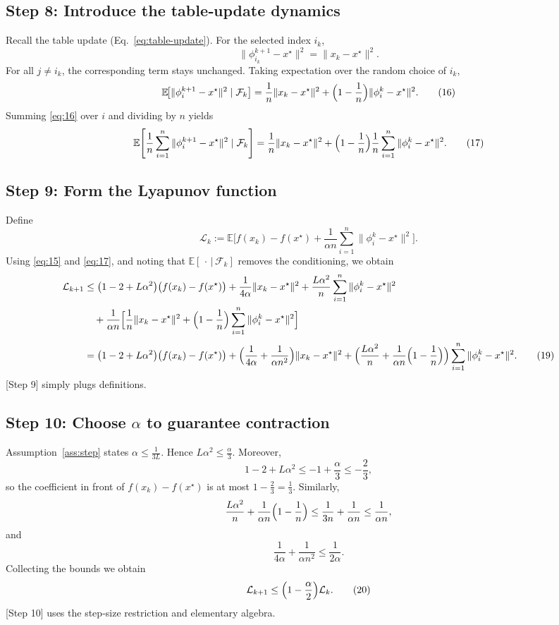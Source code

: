 \documentclass{article}
\begin{document}
\subsection*{Step 8: Introduce the table‑update dynamics}
Recall the table update (Eq.~\eqref{eq:table-update}). For the selected index $i_k$,
\[
\|\phi_{i_k}^{k+1}-x^\star\|^{2}
= \|x_k-x^\star\|^{2}.
\]
For all $j\neq i_k$, the corresponding term stays unchanged. Taking expectation over the random choice of $i_k$,
\[
\mathbb{E}\!\bigl[\|\phi_{i}^{k+1}-x^\star\|^{2}\mid\mathcal{F}_k\bigr]
= \frac{1}{n}\|x_k-x^\star\|^{2}
  +\Bigl(1-\frac{1}{n}\Bigr)\|\phi_i^{k}-x^\star\|^{2}.
\tag{16}
\]
Summing \eqref{eq:16} over $i$ and dividing by $n$ yields
\[
\mathbb{E}\!\left[\frac{1}{n}\sum_{i=1}^{n}\|\phi_i^{k+1}-x^\star\|^{2}\mid\mathcal{F}_k\right]
= \frac{1}{n}\|x_k-x^\star\|^{2}
  +\Bigl(1-\frac{1}{n}\Bigr)\frac{1}{n}\sum_{i=1}^{n}\|\phi_i^{k}-x^\star\|^{2}.
\tag{17}
\]

\subsection*{Step 9: Form the Lyapunov function}
Define
\[
\mathcal{L}_k:=\mathbb{E}\!\bigl[f(x_k)-f(x^\star)
   +\frac{1}{\alpha n}\sum_{i=1}^{n}\|\phi_i^{k}-x^\star\|^{2}\bigr].
\tag{18}
\]
Using \eqref{eq:15} and \eqref{eq:17}, and noting that $\mathbb{E}[\,\cdot\,|\,\mathcal{F}_k]$ removes the conditioning, we obtain
\begin{align}
\mathcal{L}_{k+1}
&\le \bigl(1-2+L\alpha^{2}\bigr)\bigl(f(x_k)-f(x^\star)\bigr)
    +\frac{1}{4\alpha}\|x_k-x^\star\|^{2}
    +\frac{L\alpha^{2}}{n}\sum_{i=1}^{n}\|\phi_i^{k}-x^\star\|^{2}\nonumber\\
&\quad +\frac{1}{\alpha n}\Bigl[\frac{1}{n}\|x_k-x^\star\|^{2}
      +\Bigl(1-\frac{1}{n}\Bigr)\sum_{i=1}^{n}\|\phi_i^{k}-x^\star\|^{2}\Bigr]\nonumber\\[0.3em]
&= \bigl(1-2+L\alpha^{2}\bigr)\bigl(f(x_k)-f(x^\star)\bigr)
   +\Bigl(\frac{1}{4\alpha}+\frac{1}{\alpha n^{2}}\Bigr)\|x_k-x^\star\|^{2}
   +\Bigl(\frac{L\alpha^{2}}{n}+\frac{1}{\alpha n}\Bigl(1-\frac{1}{n}\Bigr)\Bigr)
        \sum_{i=1}^{n}\|\phi_i^{k}-x^\star\|^{2}.
\tag{19}
\end{align}
[Step 9] simply plugs definitions.

\subsection*{Step 10: Choose $\alpha$ to guarantee contraction}
Assumption~\ref{ass:step} states $\alpha\le\frac{1}{3L}$. Hence $L\alpha^{2}\le\frac{\alpha}{3}$. Moreover,
\[
1-2+L\alpha^{2}\le -1+\frac{\alpha}{3}\le -\frac{2}{3},
\]
so the coefficient in front of $f(x_k)-f(x^\star)$ is at most $1-\frac{2}{3}= \frac{1}{3}$.
Similarly,
\[
\frac{L\alpha^{2}}{n}+\frac{1}{\alpha n}\Bigl(1-\frac{1}{n}\Bigr)
\le\frac{1}{3n}+\frac{1}{\alpha n}\le\frac{1}{\alpha n},
\]
and
\[
\frac{1}{4\alpha}+\frac{1}{\alpha n^{2}}\le\frac{1}{2\alpha}.
\]
Collecting the bounds we obtain
\[
\mathcal{L}_{k+1}\le\Bigl(1-\frac{\alpha}{2}\Bigr)\mathcal{L}_{k}.
\tag{20}
\]
[Step 10] uses the step‑size restriction and elementary algebra.
\end{document}
